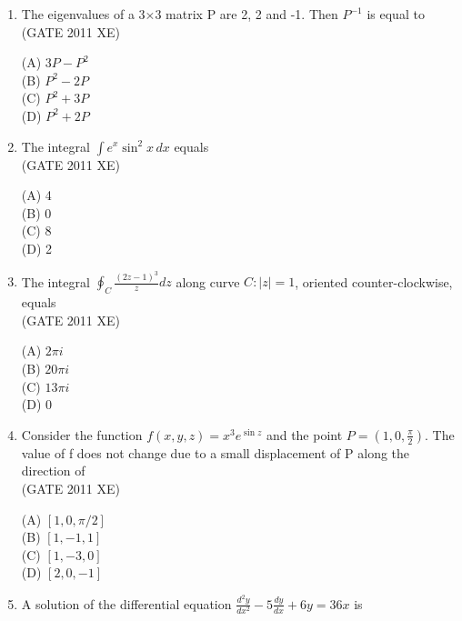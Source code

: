 \documentclass[journal,12pt,onecolumn]{IEEEtran}
\begin{document}
\begin{enumerate}
\begin{enumerate}
\begin{enumerate}[label=\textbf{Q\arabic*.},itemsep=2em]
\item The eigenvalues of a 3×3 matrix P are 2, 2 and -1. Then $P^{-1}$ is equal to \\

\hfill{(GATE 2011 XE)} \\
\begin{multicols}{4}
(A) $3P - P^2$ \\
(B) $P^2 - 2P$ \\
(C) $P^2 + 3P$ \\
(D) $P^2 + 2P$
\end{multicols}

\item The integral $\int e^x \sin^2 x \, dx$ equals \\

\hfill{(GATE 2011 XE)} \\
\begin{multicols}{4}
(A) 4 \\
(B) 0 \\
(C) 8 \\
(D) 2
\end{multicols}

\item The integral $\oint_C \frac{(2z-1)^3}{z} dz$ along curve $C: |z| = 1$, oriented counter-clockwise, equals \\

\hfill{(GATE 2011 XE)} \\
\begin{multicols}{4}
(A) $2\pi i$ \\
(B) $20\pi i$ \\
(C) $13\pi i$ \\
(D) 0
\end{multicols}

\item Consider the function $f(x,y,z) = x^3 e^{\sin z}$ and the point $P = (1,0, \frac{\pi}{2})$. The value of f does not change due to a small displacement of P along the direction of \\

\hfill{(GATE 2011 XE)} \\
\begin{multicols}{4}
(A) $[1,0,\pi/2]$ \\
(B) $[1,-1,1]$ \\
(C) $[1,-3,0]$ \\
(D) $[2,0,-1]$
\end{multicols}

\newpage

\item A solution of the differential equation $\frac{d^2 y}{dx^2} - 5 \frac{dy}{dx} + 6y = 36x$ is \\


\end{enumerate}
\end{enumerate}
\end{enumerate}
\end{document}
